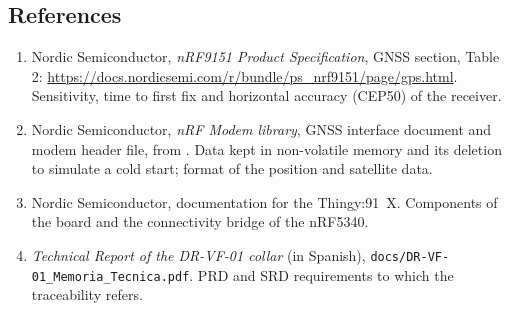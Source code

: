 \subsection{References}

\begin{enumerate}
  \item Nordic Semiconductor, \emph{nRF9151 Product Specification}, GNSS section, Table 2:
        \url{https://docs.nordicsemi.com/r/bundle/ps_nrf9151/page/gps.html}. Sensitivity, time to first fix and
        horizontal accuracy (CEP50) of the receiver.
  \item Nordic Semiconductor, \emph{nRF Modem library}, GNSS interface document and modem header file, from
        \dNcs{}. Data kept in non-volatile memory and its deletion to simulate a cold start; format of the
        position and satellite data.
  \item Nordic Semiconductor, \dNcs{} documentation for the Thingy:91~X. Components of the board and the
        connectivity bridge of the nRF5340.
  \item \emph{Technical Report of the DR-VF-01 collar} (in Spanish), \texttt{docs/DR-VF-01\_Memoria\_Tecnica.pdf}.
        PRD and SRD requirements to which the traceability refers.
\end{enumerate}
